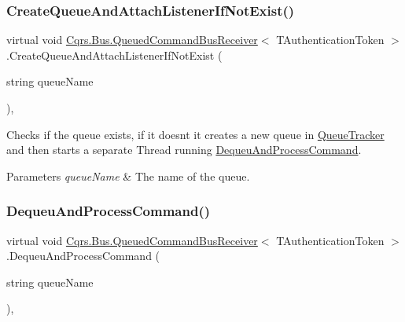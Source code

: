 \subsubsection{\texorpdfstring{Create\+Queue\+And\+Attach\+Listener\+If\+Not\+Exist()}{CreateQueueAndAttachListenerIfNotExist()}}
{\footnotesize\ttfamily virtual void \hyperlink{classCqrs_1_1Bus_1_1QueuedCommandBusReceiver}{Cqrs.\+Bus.\+Queued\+Command\+Bus\+Receiver}$<$ T\+Authentication\+Token $>$.Create\+Queue\+And\+Attach\+Listener\+If\+Not\+Exist (\begin{DoxyParamCaption}\item[{string}]{queue\+Name }\end{DoxyParamCaption})\hspace{0.3cm}{\ttfamily [protected]}, {\ttfamily [virtual]}}



Checks if the queue exists, if it doesn\textquotesingle{}t it creates a new queue in \hyperlink{classCqrs_1_1Bus_1_1QueuedCommandBusReceiver_a2fc62989429929acd8ea66808a8c4a78_a2fc62989429929acd8ea66808a8c4a78}{Queue\+Tracker} and then starts a separate Thread running \hyperlink{classCqrs_1_1Bus_1_1QueuedCommandBusReceiver_a6e00e819b9738c694fd05815938cb433_a6e00e819b9738c694fd05815938cb433}{Dequeu\+And\+Process\+Command}. 


\begin{DoxyParams}{Parameters}
{\em queue\+Name} & The name of the queue.\\
\hline
\end{DoxyParams}
\mbox{\label{classCqrs_1_1Bus_1_1QueuedCommandBusReceiver_a6e00e819b9738c694fd05815938cb433_a6e00e819b9738c694fd05815938cb433}} 
\subsubsection{\texorpdfstring{Dequeu\+And\+Process\+Command()}{DequeuAndProcessCommand()}}
{\footnotesize\ttfamily virtual void \hyperlink{classCqrs_1_1Bus_1_1QueuedCommandBusReceiver}{Cqrs.\+Bus.\+Queued\+Command\+Bus\+Receiver}$<$ T\+Authentication\+Token $>$.Dequeu\+And\+Process\+Command (\begin{DoxyParamCaption}\item[{string}]{queue\+Name }\end{DoxyParamCaption})\hspace{0.3cm}{\ttfamily [protected]}, {\ttfamily [virtual]}}



